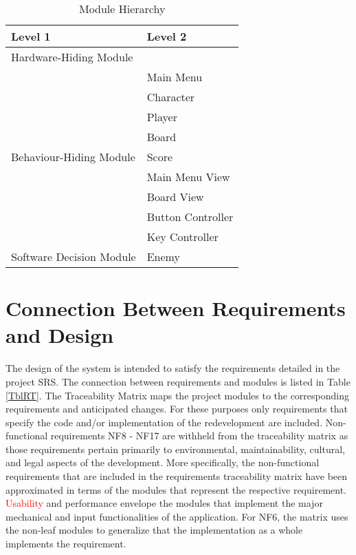 \documentclass[12pt, titlepage]{article}
\begin{document}
\begin{table}[h!]
\centering
\begin{tabular}{p{} p{}}
\toprule
\textbf{Level 1} & \textbf{Level 2}\\
\midrule

{Hardware-Hiding Module} & ~ \\
\midrule

\multirow{9}{0.3\textwidth}{Behaviour-Hiding Module}
& Main Menu\\
& Character\\
& Player\\
& Board\\
& Score\\
& Main Menu View\\ 
& Board View\\
& Button Controller\\
& Key Controller\\
\midrule

{Software Decision Module} & Enemy\\
\bottomrule

\end{tabular}
\caption{Module Hierarchy}
\label{TblMH}
\end{table}

\section{Connection Between Requirements and Design} \label{SecConnection}

The design of the system is intended to satisfy the requirements detailed in the project SRS. The connection
between requirements and modules is listed in Table \ref{TblRT}. The Traceability Matrix maps the project modules to the corresponding requirements and anticipated changes. For these purposes only requirements that specify the code and/or implementation of the redevelopment are included. Non-functional requirements NF8 - NF17 are withheld from the traceability matrix as those requirements pertain primarily to environmental, maintainability, cultural, and legal aspects of the development. More specifically, the non-functional requirements that are included in the requirements traceability matrix have been approximated in terms of the modules that represent the respective requirement. \textcolor{red}{Usability} and performance envelope the modules that implement the major mechanical and input functionalities of the application. For NF6, the matrix uses the non-leaf modules to generalize that the implementation as a whole implements the requirement.
\end{document}
